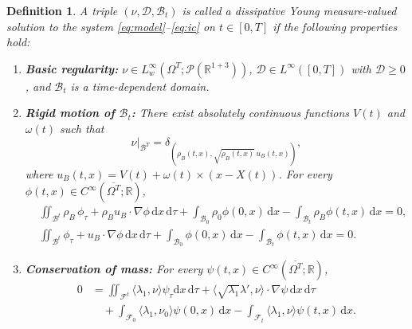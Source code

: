 \documentclass[11pt,twoside,reqno]{amsart}
\numberwithin{equation}{section}
\numberwithin{figure}{section}
\newtheorem{definition}{Definition}[section]
\begin{document}
\begin{definition}\label{def:definitionofYoungmeasure}
A triple $(\nu, \mathcal{D}, \mathcal{B}_t)$ is called a \emph{dissipative Young measure-valued solution} to the system \eqref{eq:model}–\eqref{eq:ic} on $t \in [0,T]$ if the following properties hold:

\begin{enumerate}[(1)]
\item \textbf{Basic regularity:}  
$\nu \in L^{\infty}_w(\Omega^T; \mathcal{P}(\mathbb{R}^{1+3}))$, 
$\mathcal{D} \in L^\infty([0,T])$ with $\mathcal{D} \ge 0$, 
and $\mathcal{B}_t$ is a time-dependent domain.

\item \textbf{Rigid motion of $\mathcal{B}_t$:}  
There exist absolutely continuous functions $V(t)$ and $\omega(t)$ such that
\[
\nu|_{\mathcal{B}^T} = \delta_{(\rho_B(t,x), \sqrt{\rho_B(t,x)}\,u_B(t,x))},
\]
where $u_B(t,x) = V(t) + \omega(t)\times (x - X(t))$. For every $\phi(t,x) \in C^{\infty}(\overline{\Omega^T}; \mathbb{R})$,
\begin{equation}\label{eq:MassCRigidP}
\begin{aligned}
&\iint_{\mathcal{B}^t} \rho_B \, \phi_\tau + \rho_B u_B \cdot \nabla \phi \, \mathrm{d}x\,\mathrm{d}\tau
+ \int_{\mathcal{B}_0} \rho_0 \phi(0,x)\,\mathrm{d}x
- \int_{\mathcal{B}_t} \rho_B \phi(t,x)\,\mathrm{d}x = 0, \\
&\iint_{\mathcal{B}^t} \phi_\tau + u_B \cdot \nabla \phi \, \mathrm{d}x\,\mathrm{d}\tau
+ \int_{\mathcal{B}_0} \phi(0,x)\,\mathrm{d}x
- \int_{\mathcal{B}_t} \phi(t,x)\,\mathrm{d}x = 0.
\end{aligned}
\end{equation}

\item \textbf{Conservation of mass:}  
For every $\psi(t,x) \in C^{\infty}(\overline{\Omega^T}; \mathbb{R})$,
\begin{equation}\label{MVS MassC}
\begin{aligned}
0 &= \iint_{\mathcal{F}^t} \langle \lambda_1, \nu \rangle \psi_\tau \mathrm{d}x\,\mathrm{d}\tau 
  + \langle \sqrt{\lambda_1}\lambda', \nu \rangle \cdot \nabla \psi \, \mathrm{d}x\,\mathrm{d}\tau \\
&\quad + \int_{\mathcal{F}_0} \langle \lambda_1, \nu_0 \rangle \psi(0,x)\,\mathrm{d}x
 - \int_{\mathcal{F}_t} \langle \lambda_1, \nu \rangle \psi(t,x)\,\mathrm{d}x.
\end{aligned}
\end{equation}


\end{enumerate}
\end{definition}
\end{document}
